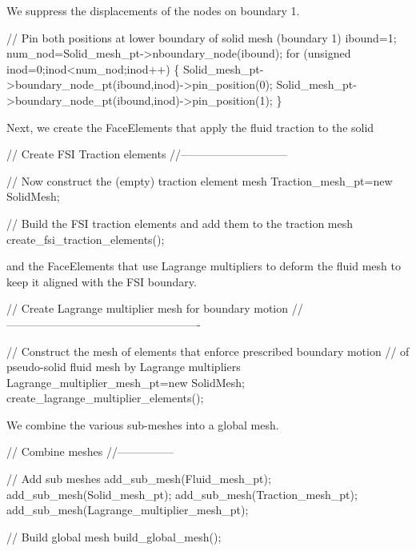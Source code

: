 We suppress the displacements of the nodes on boundary 1.


\begin{DoxyCodeInclude}
 
 \textcolor{comment}{// Pin both positions at lower boundary of solid mesh (boundary 1)}
 ibound=1;
 num\_nod=Solid\_mesh\_pt->nboundary\_node(ibound);
 \textcolor{keywordflow}{for} (\textcolor{keywordtype}{unsigned} inod=0;inod<num\_nod;inod++)
  \{    
   Solid\_mesh\_pt->boundary\_node\_pt(ibound,inod)->pin\_position(0);
   Solid\_mesh\_pt->boundary\_node\_pt(ibound,inod)->pin\_position(1);
  \}

\end{DoxyCodeInclude}


Next, we create the {\ttfamily Face\+Elements} that apply the fluid traction to the solid


\begin{DoxyCodeInclude}


 \textcolor{comment}{// Create FSI Traction elements}
 \textcolor{comment}{//-----------------------------}

 \textcolor{comment}{// Now construct the (empty) traction element mesh}
 Traction\_mesh\_pt=\textcolor{keyword}{new} SolidMesh;

  \textcolor{comment}{// Build the FSI traction elements and add them to the traction mesh}
 create\_fsi\_traction\_elements();

\end{DoxyCodeInclude}


and the {\ttfamily Face\+Elements} that use Lagrange multipliers to deform the fluid mesh to keep it aligned with the F\+SI boundary.


\begin{DoxyCodeInclude}

 \textcolor{comment}{// Create Lagrange multiplier mesh for boundary motion}
 \textcolor{comment}{//----------------------------------------------------}
 
 \textcolor{comment}{// Construct the mesh of elements that enforce prescribed boundary motion}
 \textcolor{comment}{// of pseudo-solid fluid mesh by Lagrange multipliers}
 Lagrange\_multiplier\_mesh\_pt=\textcolor{keyword}{new} SolidMesh;
 create\_lagrange\_multiplier\_elements();

\end{DoxyCodeInclude}


We combine the various sub-\/meshes into a global mesh.


\begin{DoxyCodeInclude}


 \textcolor{comment}{// Combine meshes}
 \textcolor{comment}{//---------------}

 \textcolor{comment}{// Add sub meshes}
 add\_sub\_mesh(Fluid\_mesh\_pt);
 add\_sub\_mesh(Solid\_mesh\_pt);
 add\_sub\_mesh(Traction\_mesh\_pt);
 add\_sub\_mesh(Lagrange\_multiplier\_mesh\_pt);
 
 \textcolor{comment}{// Build global mesh}
 build\_global\_mesh();

\end{DoxyCodeInclude}


